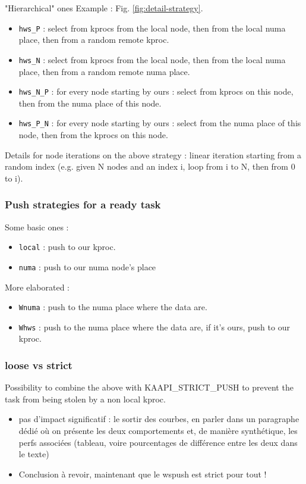 \documentclass{Styles/llncs}
\begin{document}
"Hierarchical" ones
Example : Fig. \ref{fig:detail-strategy}.
\begin{itemize}
  \item \verb/hws_P/ : select from kprocs from the local node, then from the local numa place, then from a random remote kproc.
  \item \verb/hws_N/ : select from kprocs from the local node, then from the local numa place, then from a random remote numa place.
  \item \verb/hws_N_P/ : for every node starting by ours : select from kprocs on this node, then from the numa place of this node.
  \item \verb/hws_P_N/ : for every node starting by ours : select from the numa place of this node, then from the kprocs on this node.
\end{itemize}

Details for node iterations on the above strategy : linear iteration starting from a random index (e.g. given N nodes and an index i, loop from i to N, then from 0 to i).

\subsubsection{Push strategies for a ready task}
Some basic ones :
\begin{itemize}
  \item \verb/local/ : push to our kproc.
  \item \verb/numa/ : push to our numa node's place
\end{itemize}

More elaborated :
\begin{itemize}
  \item \verb/Wnuma/ : push to the numa place where the data are.
  \item \verb/Whws/ : push to the numa place where the data are, if it's ours, push to our kproc.
\end{itemize}


\subsubsection{loose vs strict}

Possibility to combine the above with KAAPI\_STRICT\_PUSH to prevent the task from being stolen by a non local kproc.

\begin{itemize}
  \item pas d'impact significatif : le sortir des courbes, en parler
    dans un paragraphe dédié où on présente les deux comportements et,
    de manière synthétique, les perfs associées (tableau, voire
    pourcentages de différence entre les deux dans le texte)
  \item {\color{red}Conclusion à revoir, maintenant que le wspush est strict pour tout !}
\end{itemize}
\end{document}
